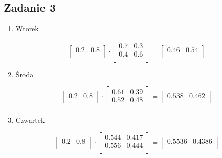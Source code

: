 \subsection{Zadanie 3}

\begin{enumerate}
 \item Wtorek
  
  $$
  \begin{bmatrix}
   0.2 & 0.8 \\
  \end{bmatrix}
  \cdot
  \begin{bmatrix}
   0.7 & 0.3 \\
   0.4 & 0.6 \\
  \end{bmatrix}
  =
  \begin{bmatrix}
   0.46 & 0.54 \\
  \end{bmatrix}
  $$
  
 \item Środa
 
  $$
  \begin{bmatrix}
   0.2 & 0.8 \\
  \end{bmatrix}
  \cdot
  \begin{bmatrix}
   0.61 & 0.39 \\
   0.52 & 0.48 \\
  \end{bmatrix}
  =
  \begin{bmatrix}
   0.538 & 0.462 \\
  \end{bmatrix}
  $$
  
 \item Czwartek
 
  $$
  \begin{bmatrix}
   0.2 & 0.8 \\
  \end{bmatrix}
  \cdot
  \begin{bmatrix}
   0.544 & 0.417 \\
   0.556 & 0.444 \\
  \end{bmatrix}
  =
  \begin{bmatrix}
   0.5536 & 0.4386 \\
  \end{bmatrix}
  $$
\end{enumerate}
